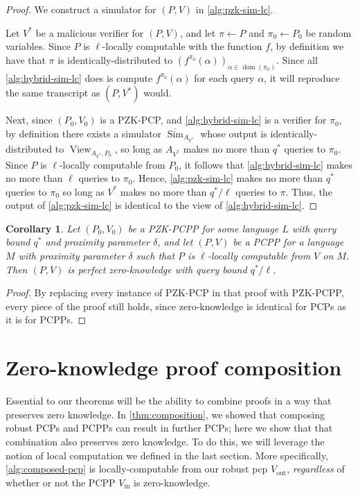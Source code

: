 \documentclass[english,12pt]{reedthesis}
\theoremstyle{plain}
\newtheorem{cor}[cor]{Corollary}
\theoremstyle{definition}
\theoremstyle{remark}
\DeclareMathOperator{\dom}{dom}
\DeclareMathOperator{\out}{out}
\DeclareMathOperator{\oin}{in}
\DeclareMathOperator{\Sim}{Sim}
\DeclareMathOperator{\View}{View}
\begin{document}
\begin{proof}
  We construct a simulator for $(P, V)$ in \cref{alg:pzk-sim-lc}.

  Let $V^{*}$ be a malicious verifier for $(P, V)$, and let $\pi \leftarrow P$ and
  $\pi_{0} \leftarrow P_{0}$ be random variables. Since $P$ is $\ell$-locally computable with
  the function $f$, by definition we have that $\pi$ is identically-distributed to
  $(f^{\pi_{0}}(\alpha))_{\alpha \in \dom(\pi_{0})}$. Since all \cref{alg:hybrid-sim-lc} does is
  compute $f^{\pi_{0}}(\alpha)$ for each query $\alpha$, it will reproduce the same
  transcript as $(P, V^{*})$ would.

  Next, since $(P_{0}, V_{0})$ is a PZK-PCP, and \cref{alg:hybrid-sim-lc} is a
  verifier for $\pi_{0}$, by definition there exists a simulator
  $\overline{\Sim}_{A_{V^{*}}}$ whose output is identically-distributed to
  $\View_{A_{V^{*}}, P_{0}}$, so long as $A_{V^{*}}$ makes no more than $q^{*}$
  queries to $\pi_{0}$. Since $P$ is $\ell$-locally computable from $P_{0}$, it
  follows that \cref{alg:hybrid-sim-lc} makes no more than $\ell$ queries to
  $\pi_{0}$. Hence, \cref{alg:pzk-sim-lc} makes no more than $q^{*}$ queries to
  $\pi_{0}$ so long as $V^{*}$ makes no more than $q^{*}/\ell$ queries to $\pi$. Thus,
  the output of \cref{alg:pzk-sim-lc} is identical to the view of
  \cref{alg:hybrid-sim-lc}.
\end{proof}

\begin{cor}\label{cor:local-comp-pzk}
  Let $(P_{0}, V_{0})$ be a PZK-PCPP for some language $L$ with query bound
  $q^{*}$ and proximity parameter $\delta$, and let $(P, V)$ be a PCPP for a language
  $M$ with proximity parameter $\delta$ such that $P$ is $\ell$-locally computable
  from $V$ on $M$. Then $(P, V)$ is perfect zero-knowledge with query bound
  $q^{*}/\ell$.
\end{cor}

\begin{proof}
  By replacing every instance of PZK-PCP in that proof with PZK-PCPP, every
  piece of the proof still holds, since zero-knowledge is identical for PCPs as
  it is for PCPPs.
\end{proof}

\section{Zero-knowledge proof composition}\label{sec:zk-proof-comp}

Essential to our theorems will be the ability to combine proofs in a way that
preserves zero knowledge. In \cref{thm:composition}, we showed that composing
robust PCPs and PCPPs can result in further PCPs; here we show that that
combination also preserves zero knowledge. To do this, we will leverage the
notion of local computation we defined in the last section. More specifically,
\cref{alg:composed-pcp} is locally-computable from our robust pcp $V_{\out}$,
\emph{regardless} of whether or not the PCPP $V_{\oin}$ is zero-knowledge.
\end{document}
